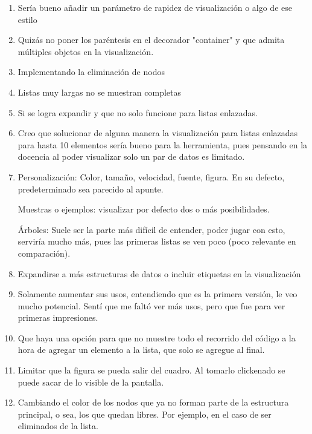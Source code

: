\begin{enumerate}
    \item Sería bueno añadir un parámetro de rapidez de visualización o algo de ese estilo
    \item Quizás no poner los paréntesis en el decorador "container" y que admita múltiples objetos en la visualización.
    \item Implementando la eliminación de nodos
    \item Listas muy largas no se muestran completas
    \item Si se logra expandir y que no solo funcione para listas enlazadas.
    \item Creo que solucionar de alguna manera la visualización para listas enlazadas para hasta 10 elementos sería bueno para la herramienta, pues pensando en la docencia al poder visualizar solo un par de datos es limitado.
    \item Personalización: Color, tamaño, velocidad, fuente, figura. En su defecto, predeterminado sea parecido al apunte.

          Muestras o ejemplos: visualizar por defecto dos o más posibilidades.

          Árboles: Suele ser la parte más difícil de entender, poder jugar con esto, serviría mucho más, pues las primeras listas se ven poco (poco relevante en comparación).

    \item Expandirse a más estructuras de datos o incluir etiquetas en la visualización
    \item Solamente aumentar sus usos, entendiendo que es la primera versión, le veo mucho potencial. Sentí que me faltó ver más usos, pero que fue para ver primeras impresiones.
    \item Que haya una opción para que no muestre todo el recorrido del código a la hora de agregar un elemento a la lista, que solo se agregue al final.
    \item Limitar que la figura se pueda salir del cuadro. Al tomarlo clickenado se puede sacar de lo visible de la pantalla.
    \item Cambiando el color de los nodos que ya no forman parte de la estructura principal, o sea, los que quedan libres. Por ejemplo, en el caso de ser eliminados de la lista.
\end{enumerate}